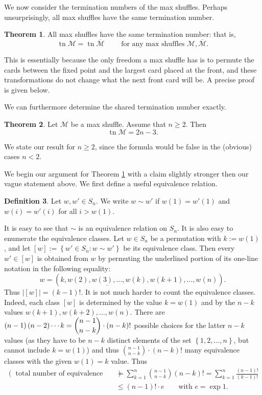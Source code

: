 \documentclass[final,nomarks]{dmtcs-episciences}
\theoremstyle{definition}
\newtheorem{thm}{Theorem}[section]
\theoremstyle{definition}
\newtheorem{defn}[thm]{Definition}
\theoremstyle{remark}
\newcommand{\M}{\mathcal{M}} %
\newcommand{\Mo}{\overline{\mathcal{M}}} %
\newcommand{\tn}{\operatorname{tn }} %
\newcommand{\tup}[1]{\left( #1 \right)}
\newcommand{\set}[1]{\left\{ #1 \right\}}
\newcommand{\card}[1]{\left| #1 \right|}
\begin{document}
We now consider the termination numbers of the max shuffles. Perhaps unsurprisingly, all max shuffles have the same termination number. 
\begin{thm}
    \label{mshufSt2}
    All max shuffles have the same termination number: that is,
    \[
    \tn \M = \tn \Mo \qquad \text{ for any max shuffles } \M,\Mo .
    \]
\end{thm}

This is essentially because the only freedom a max shuffle has is to permute the cards between the fixed point and the largest card placed at the front, and these transformations do not change what the next front card will be. A precise proof is given below.

We can furthermore determine the shared termination number exactly.

\begin{thm}
    \label{mshufTN}
    Let $\M $ be a max shuffle. Assume that $n \ge 2$. Then 
    \[
    \tn \M = 2n-3.
    \]
\end{thm}

We state our result for $n \ge 2$, since the formula would be false in the (obvious) cases $n < 2$.


We begin our argument for Theorem \ref{mshufSt2} with a claim slightly stronger then our vague statement above. We first define a useful equivalence relation.

\begin{defn}
    \label{shuf_eq}
    Let $w,w' \in S_n$. We write $w \sim w'$ if $w(1) = w'(1)$ and $w(i) = w'(i)$ for all $i > w(1)$.
\end{defn}

It is easy to see that $\sim$ is an equivalence relation on $S_n$. It is also easy to enumerate the equivalence classes. Let $w \in S_n$ be a permutation with $k := w(1)$, and let $[w] := \set{w' \in S_n : w \sim w'}$ be its equivalence class.
Then every $w' \in [w]$ is obtained from $w$ by permuting the underlined portion of its one-line notation in the following equality:
    \[
    w = \tup{k,\underline{w(2),w(3),\dots,w(k)},w(k+1),\dots,w(n)} .
    \]
Thus $\card{[w]} = \tup{k-1}!$. It is not much harder to count the equivalence classes. Indeed, each class $[w]$ is determined by the value $k = w\tup{1}$ and by the $n-k$ values $w(k+1), w(k+2), \ldots, w(n)$. There are $\tup{n-1}\tup{n-2}\cdots k = \dbinom{n-1}{n-k} \cdot \tup{n-k}!$ possible choices for the latter $n-k$ values (as they have to be $n-k$ distinct elements of the set $\set{1,2,\ldots,n}$, but cannot include $k = w\tup{1}$) and thus $\binom{n-1}{n-k} \cdot \tup{n-k}!$ many equivalence classes with the given $w\tup{1} = k$ value. Thus
   \begin{align*}
   \tup{\text{ total number of equivalence classes }} &= \sum_{k=1}^n \binom{n-1}{n-k}\tup{n-k}! = \sum_{k=1}^n \frac{\tup{n-1}!}{\tup{k-1}!}  \\
   &\le \tup{n-1}! \cdot e \qquad \text{with } e = \exp 1.
   \end{align*}
   
\end{document}

